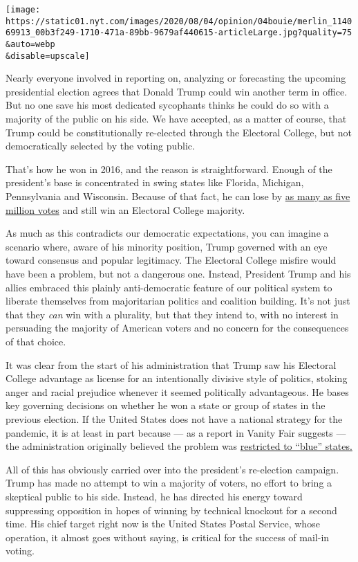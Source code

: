 \texttt{[image: https://static01.nyt.com/images/2020/08/04/opinion/04bouie/merlin\_114069913\_00b3f249-1710-471a-89bb-9679af440615-articleLarge.jpg?quality=75\\\&auto=webp\\\&disable=upscale]}

Nearly everyone involved in reporting on, analyzing or forecasting the
upcoming presidential election agrees that Donald Trump could win
another term in office. But no one save his most dedicated sycophants
thinks he could do so with a majority of the public on his side. We have
accepted, as a matter of course, that Trump could be constitutionally
re-elected through the Electoral College, but not democratically
selected by the voting public.

That's how he won in 2016, and the reason is straightforward. Enough of
the president's base is concentrated in swing states like Florida,
Michigan, Pennsylvania and Wisconsin. Because of that fact, he can lose
by
\href{https://www.nbcnews.com/politics/2020-election/how-trump-could-lose-5-million-votes-still-win-2020-n1031601}{as
many as five million votes} and still win an Electoral College majority.

As much as this contradicts our democratic expectations, you can imagine
a scenario where, aware of his minority position, Trump governed with an
eye toward consensus and popular legitimacy. The Electoral College
misfire would have been a problem, but not a dangerous one. Instead,
President Trump and his allies embraced this plainly anti-democratic
feature of our political system to liberate themselves from majoritarian
politics and coalition building. It's not just that they \emph{can} win
with a plurality, but that they intend to, with no interest in
persuading the majority of American voters and no concern for the
consequences of that choice.

It was clear from the start of his administration that Trump saw his
Electoral College advantage as license for an intentionally divisive
style of politics, stoking anger and racial prejudice whenever it seemed
politically advantageous. He bases key governing decisions on whether he
won a state or group of states in the previous election. If the United
States does not have a national strategy for the pandemic, it is at
least in part because --- as a report in Vanity Fair suggests --- the
administration originally believed the problem was
\href{https://www.vanityfair.com/news/2020/07/how-jared-kushners-secret-testing-plan-went-poof-into-thin-air}{restricted
to ``blue'' states.}

All of this has obviously carried over into the president's re-election
campaign. Trump has made no attempt to win a majority of voters, no
effort to bring a skeptical public to his side. Instead, he has directed
his energy toward suppressing opposition in hopes of winning by
technical knockout for a second time. His chief target right now is the
United States Postal Service, whose operation, it almost goes without
saying, is critical for the success of mail-in voting.

